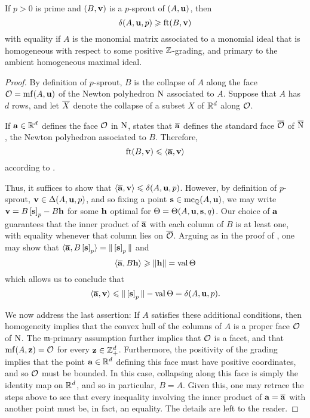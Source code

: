 \documentclass[11pt]{amsart}
\begin{document}

\begin{lemma}  If  $p>0$ is prime and $(B, \mathbf{v})$ is a $p$-sprout of  $(A, \mathbf{u})$, then \[ \delta(A, \mathbf{u}, p) \geqslant \operatorname{ft}(B, \mathbf{v})\]
with equality if $A$ is the monomial matrix associated to a monomial ideal that is homogeneous with respect to some positive $\mathbb{Z}$-grading, and primary to the ambient homogeneous maximal ideal.
\end{lemma}

\begin{proof}
By definition of $p$-sprout,  $B$ is the collapse of $A$ along the face $\mathcal{O} = \operatorname{mf}(A, \mathbf{u})$ of the Newton polyhedron $\mathrm{N}$ associated to $A$.  Suppose that $A$ has $d$ rows, and let $\overline{X}$ denote the collapse of a subset $X$ of $\mathbb{R}^d$ along $\mathcal{O}$.  

If $\mathbf{a} \in \mathbb{R}^d$ defines the face $\mathcal{O}$ in $\mathrm{N}$,   states that $\overline{\mathbf{a}}$ defines the standard face $\overline{\mathcal{O}}$ of $\overline{\mathrm{N}}$, the Newton polyhedron associated to $B$.  Therefore,
\[ \operatorname{ft}(B, \mathbf{v}) \leqslant \langle \overline{\mathbf{a}}, \mathbf{v} \rangle \] according to .

Thus, it suffices to show that $\langle \overline{\mathbf{a}}, \mathbf{v} \rangle \leqslant \delta(A, \mathbf{u}, p)$.  However, by definition of $p$-sprout, $\mathbf{v} \in \Delta(A, \mathbf{u}, p)$, and so fixing a point $\mathbf{s} \in \operatorname{mc}_{\mathbb{Q}}(A, \mathbf{u})$, we may write $ \mathbf{v} = B \left[ \mathbf{s} \right]_p - B \mathbf{h}$ for some $\mathbf{h}$  optimal for $\Theta = \Theta(A, \mathbf{u}, \mathbf{s}, q)$.  Our choice of $\mathbf{a}$ guarantees that the inner product of $\overline{\mathbf{a}}$ with each column of $B$ is at least one, with equality whenever that column lies on $\overline{\mathcal{O}}$.  Arguing as in the proof of , one may show that $\langle \overline{\mathbf{a}}, B \left[ \mathbf{s} \right]_p \rangle = \| \left[ \mathbf{s} \right]_p \|$ and \[ \langle \overline{\mathbf{a}},  B \mathbf{h} \rangle \geqslant \| \mathbf{h} \| = \operatorname{val} \Theta \] 
which allows us to conclude that \[ \langle \overline{\mathbf{a}}, \mathbf{v} \rangle \leqslant \| \left[ \mathbf{s} \right]_p \| - \operatorname{val} \Theta= \delta(A, \mathbf{u}, p).\]

We now address the last assertion:  If $A$ satisfies these additional conditions, then homogeneity implies that the convex hull of the columns of $A$ is a proper face $\mathcal{O}$ of $\mathrm{N}$.  The $\mathfrak{m}$-primary assumption further implies that $\mathcal{O}$ is a facet, and that $\operatorname{mf}(A, \mathbf{z}) = \mathcal{O}$ for every $\mathbf{z} \in \mathbb{Z}_+^d$.  Furthermore, the positivity of the grading implies that the point $\mathbf{a} \in \mathbb{R}^d$ defining this face must have positive coordinates, and so $\mathcal{O}$ must be bounded.  In this case, collapsing along this face is simply the identity map on $\mathbb{R}^d$, and so in particular, $B=A$.  Given this, one may retrace the steps above to see that every inequality involving the inner product of $\mathbf{a} = \overline{\mathbf{a}}$ with another point must be, in fact, an equality.  The details are left to the reader.
\end{proof}
\end{document}

